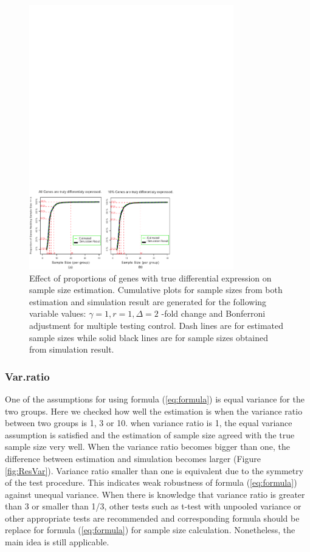 \documentclass{bioinfo}
\begin{document}
\begin{figure}[h]
    \centerline{\includegraphics*[width=3.5in]{ResAlt.pdf}}
    \caption[Effect of proportions of genes with true differential expression on sample size estimation]
    {Effect of proportions of genes with true differential expression on sample size estimation.
    Cumulative plots for sample sizes from both estimation and simulation result
    are generated for the following variable values: $\gamma = 1, r = 1, \Delta = 2$ -fold change
    and Bonferroni adjustment for multiple testing control. Dash lines are for estimated sample sizes
    while solid black lines are for sample sizes obtained from simulation result.}
    \label{fig:ResAlt}
\end{figure}

\subsubsection{Var.ratio}

One of the assumptions for using formula (\ref{eq:formula}) is
equal variance for the two groups. Here we checked how well the
estimation is when the variance ratio between two groups is 1, 3
or 10. when variance ratio is 1, the equal variance assumption is
satisfied and the estimation of sample size agreed with the true
sample size very well. When the variance ratio becomes bigger than
one, the difference between estimation and simulation becomes
larger (Figure \ref{fig:ResVar}). Variance ratio smaller than one
is equivalent due to the symmetry of the test procedure. This
indicates weak robustness of  formula (\ref{eq:formula}) against
unequal variance. When there is knowledge that variance ratio is
greater than 3 or smaller than 1/3, other tests such as t-test
with unpooled variance or other appropriate tests are recommended
and corresponding formula should be replace for formula
(\ref{eq:formula}) for sample size calculation. Nonetheless, the
main idea is still applicable.
\end{document}
